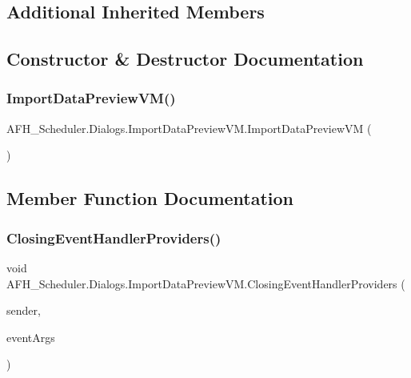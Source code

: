 \subsection*{Additional Inherited Members}


\subsection{Constructor \& Destructor Documentation}
\mbox{\label{class_a_f_h___scheduler_1_1_dialogs_1_1_import_data_preview_v_m_a7e726ed3cbe41a603b8746ab5f0a43f1}} 
\subsubsection{ImportDataPreviewVM()}
{\footnotesize\ttfamily A\+F\+H\+\_\+\+Scheduler.\+Dialogs.\+Import\+Data\+Preview\+V\+M.\+Import\+Data\+Preview\+VM (\begin{DoxyParamCaption}{ }\end{DoxyParamCaption})}



\subsection{Member Function Documentation}
\mbox{\label{class_a_f_h___scheduler_1_1_dialogs_1_1_import_data_preview_v_m_aaceea863fbedd3c8ba1f772a21cd13ed}} 
\subsubsection{ClosingEventHandlerProviders()}
{\footnotesize\ttfamily void A\+F\+H\+\_\+\+Scheduler.\+Dialogs.\+Import\+Data\+Preview\+V\+M.\+Closing\+Event\+Handler\+Providers (\begin{DoxyParamCaption}\item[{object}]{sender,  }\item[{Dialog\+Closing\+Event\+Args}]{event\+Args }\end{DoxyParamCaption})}

